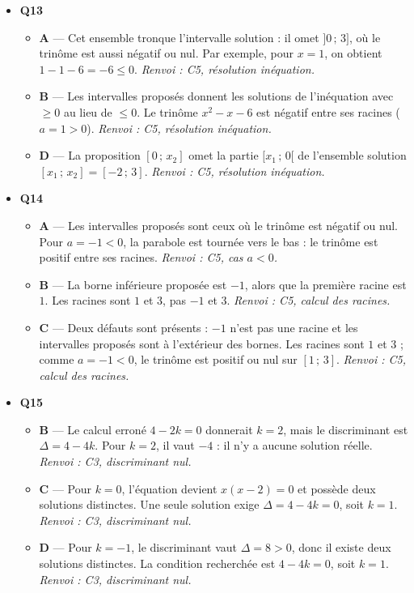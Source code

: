 \begin{itemize}
\begin{itemize}
  \end{itemize}
  \item \textbf{Q13}
  \begin{itemize}
    \item \textbf{A} — Cet ensemble tronque l’intervalle solution : il omet $]0\,;\,3]$, où le trinôme est aussi négatif ou nul. Par exemple, pour $x=1$, on obtient $1-1-6=-6\leq0$. \emph{Renvoi : C5, résolution inéquation.}
    \item \textbf{B} — Les intervalles proposés donnent les solutions de l’inéquation avec $\geq0$ au lieu de $\leq0$. Le trinôme $x^2-x-6$ est négatif entre ses racines ($a=1>0$). \emph{Renvoi : C5, résolution inéquation.}
    \item \textbf{D} — La proposition $[0\,;\,x_2]$ omet la partie $[x_1\,;\,0[$ de l’ensemble solution $[x_1\,;\,x_2]=[-2\,;\,3]$. \emph{Renvoi : C5, résolution inéquation.}
  \end{itemize}
  \item \textbf{Q14}
  \begin{itemize}
    \item \textbf{A} — Les intervalles proposés sont ceux où le trinôme est négatif ou nul. Pour $a=-1<0$, la parabole est tournée vers le bas : le trinôme est positif entre ses racines. \emph{Renvoi : C5, cas $a<0$.}
    \item \textbf{B} — La borne inférieure proposée est $-1$, alors que la première racine est $1$. Les racines sont $1$ et $3$, pas $-1$ et $3$. \emph{Renvoi : C5, calcul des racines.}
    \item \textbf{C} — Deux défauts sont présents : $-1$ n’est pas une racine et les intervalles proposés sont à l’extérieur des bornes. Les racines sont $1$ et $3$ ; comme $a=-1<0$, le trinôme est positif ou nul sur $[1\,;\,3]$. \emph{Renvoi : C5, calcul des racines.}
  \end{itemize}
  \item \textbf{Q15}
  \begin{itemize}
    \item \textbf{B} — Le calcul erroné $4-2k=0$ donnerait $k=2$, mais le discriminant est $\Delta=4-4k$. Pour $k=2$, il vaut $-4$ : il n’y a aucune solution réelle. \emph{Renvoi : C3, discriminant nul.}
    \item \textbf{C} — Pour $k=0$, l’équation devient $x(x-2)=0$ et possède deux solutions distinctes. Une seule solution exige $\Delta=4-4k=0$, soit $k=1$. \emph{Renvoi : C3, discriminant nul.}
    \item \textbf{D} — Pour $k=-1$, le discriminant vaut $\Delta=8>0$, donc il existe deux solutions distinctes. La condition recherchée est $4-4k=0$, soit $k=1$. \emph{Renvoi : C3, discriminant nul.}

\end{itemize}
\end{itemize}
